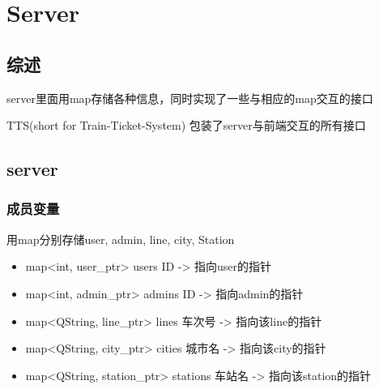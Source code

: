 \section{Server}

\subsection{综述}
    server里面用map存储各种信息，同时实现了一些与相应的map交互的接口

    TTS(short for Train-Ticket-System)
    包装了server与前端交互的所有接口

\subsection{server}
    \subsubsection{成员变量}
    用map分别存储user, admin, line, city, Station
    \begin{itemize}
        \item map<int, user_ptr> users
        ID -> 指向user的指针
        \item map<int, admin_ptr> admins
        ID -> 指向admin的指针
        \item map<QString, line_ptr> lines
        车次号 -> 指向该line的指针
        \item map<QString, city_ptr> cities
        城市名 -> 指向该city的指针
        \item map<QString, station_ptr> stations
        车站名 -> 指向该station的指针
    \end{itemize}

